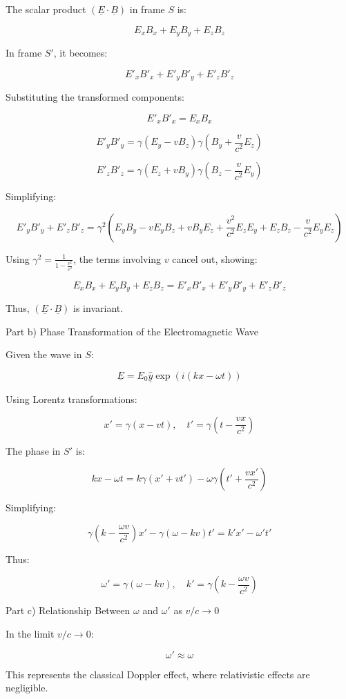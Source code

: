 \documentclass[a4paper,11pt]{article}
\begin{document}
The scalar product \((\underline{E} \cdot \underline{B})\) in frame \(S\) is:

\[
E_x B_x + E_y B_y + E_z B_z
\]

In frame \(S'\), it becomes:

\[
E'_x B'_x + E'_y B'_y + E'_z B'_z
\]

Substituting the transformed components:

\[
E'_x B'_x = E_x B_x
\]

\[
E'_y B'_y = \gamma(E_y - vB_z) \gamma(B_y + \frac{v}{c^2} E_z)
\]

\[
E'_z B'_z = \gamma(E_z + vB_y) \gamma(B_z - \frac{v}{c^2} E_y)
\]

Simplifying:

\[
E'_y B'_y + E'_z B'_z = \gamma^2 \left( E_y B_y - vE_y B_z + vB_y E_z + \frac{v^2}{c^2} E_z E_y + E_z B_z - \frac{v}{c^2} E_y E_z \right)
\]

Using \(\gamma^2 = \frac{1}{1 - \frac{v^2}{c^2}}\), the terms involving \(v\) cancel out, showing:

\[
E_x B_x + E_y B_y + E_z B_z = E'_x B'_x + E'_y B'_y + E'_z B'_z
\]

Thus, \((\underline{E} \cdot \underline{B})\) is invariant.

Part b) Phase Transformation of the Electromagnetic Wave

Given the wave in \(S\):

\[
\underline{E} = E_0 \hat{\underline{y}} \exp(i(kx - \omega t))
\]

Using Lorentz transformations:

\[
x' = \gamma(x - vt), \quad t' = \gamma\left(t - \frac{vx}{c^2}\right)
\]

The phase in \(S'\) is:

\[
kx - \omega t = k\gamma(x' + vt') - \omega\gamma(t' + \frac{vx'}{c^2})
\]

Simplifying:

\[
\gamma(k - \frac{\omega v}{c^2})x' - \gamma(\omega - kv)t' = k'x' - \omega't'
\]

Thus:

\[
\omega' = \gamma(\omega - kv), \quad k' = \gamma(k - \frac{\omega v}{c^2})
\]

Part c) Relationship Between \(\omega\) and \(\omega'\) as \(v/c \rightarrow 0\)

In the limit \(v/c \rightarrow 0\):

\[
\omega' \approx \omega
\]

This represents the classical Doppler effect, where relativistic effects are negligible.
\end{document}
